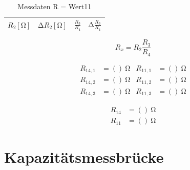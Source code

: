\begin{table}
  \centering
  \caption{Messdaten R = Wert11}
  \label{tab:2}
  \begin{tabular}{c c c c}
    \toprule
    {$R_2 [\si{\ohm}]$} & {$\increment R_2 [\si{\ohm}]$} & {$\frac{R_3}{R_4}$} & {$\increment \frac{R_3}{R_4}$} \\
    \midrule
    
    \bottomrule
  \end{tabular}
\end{table}

\begin{equation}
  R_x = R_2 \frac{R_3}{R_4}
\end{equation}

\begin{align}
  R_{14,1}   &= ()\:\si{\ohm} & R_{11,1} &= ()\:\si{\ohm}\\
  R_{14,2}   &= ()\:\si{\ohm} & R_{11,2} &= ()\:\si{\ohm}\\
  R_{14,3}   &= ()\:\si{\ohm} & R_{11,3} &= ()\:\si{\ohm}
\end{align}

\begin{align}
  R_{14}   &= ()\:\si{\ohm}\\
  R_{11}   &= ()\:\si{\ohm}
\end{align}

\section{Kapazitätsmessbrücke}
